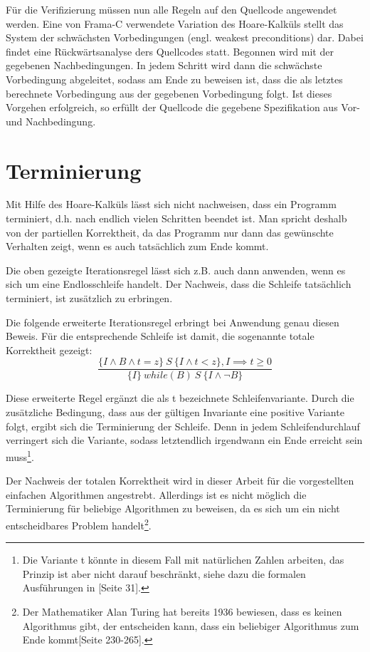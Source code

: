 Für die Verifizierung müssen nun alle Regeln auf den Quellcode angewendet werden. Eine von Frama-C verwendete Variation des Hoare-Kalküls
stellt das System der schwächsten Vorbedingungen (engl. weakest preconditions) dar. Dabei findet eine Rückwärtsanalyse
ders Quellcodes statt. Begonnen wird mit der gegebenen Nachbedingungen. In jedem Schritt wird dann die schwächste Vorbedingung
abgeleitet, sodass am Ende zu beweisen ist, dass die als letztes berechnete Vorbedingung aus der gegebenen Vorbedingung folgt.
Ist dieses Vorgehen erfolgreich, so erfüllt der Quellcode die gegebene Spezifikation aus Vor- und Nachbedingung.

\section{Terminierung}

Mit Hilfe des Hoare-Kalküls lässt sich nicht nachweisen, dass ein Programm terminiert, d.h. nach endlich vielen Schritten 
beendet ist. Man spricht deshalb von der partiellen Korrektheit, da das Programm nur dann das gewünschte 
Verhalten zeigt, wenn es auch tatsächlich zum Ende kommt.

Die oben gezeigte Iterationsregel lässt sich z.B. auch dann anwenden, wenn es sich um eine Endlosschleife handelt. Der Nachweis,
dass die Schleife tatsächlich terminiert, ist zusätzlich zu erbringen. 

Die folgende erweiterte Iterationsregel erbringt bei Anwendung genau diesen Beweis. Für die entsprechende Schleife ist damit, die
sogenannte totale Korrektheit gezeigt:
\begin{displaymath}
\frac{\{I \land B \land t = z \} \:S\: \{I \land t < z\}, I \implies t \geq 0}{\{I\}\: while(B)\: S\: \{I \land \neg B\}}
\end{displaymath}

Diese erweiterte Regel ergänzt die als t bezeichnete Schleifenvariante. Durch die zusätzliche Bedingung, dass aus der gültigen Invariante
eine positive Variante folgt, ergibt sich die Terminierung der Schleife. Denn in jedem Schleifendurchlauf verringert sich die Variante,
sodass letztendlich irgendwann ein Ende erreicht sein muss\footnote{Die Variante t könnte in diesem Fall mit natürlichen Zahlen arbeiten,
das Prinzip ist aber nicht darauf beschränkt, siehe dazu die formalen Ausführungen in \cite{floyd}[Seite 31].}.

Der Nachweis der totalen Korrektheit wird in dieser Arbeit für die vorgestellten einfachen Algorithmen angestrebt.
Allerdings ist es nicht möglich die Terminierung für beliebige Algorithmen zu beweisen, da es sich um ein nicht entscheidbares 
Problem handelt\footnote{Der Mathematiker Alan Turing hat bereits 1936 bewiesen, dass es keinen Algorithmus gibt, der 
entscheiden kann, dass ein beliebiger Algorithmus zum Ende kommt\cite{turing}[Seite 230-265].}.

